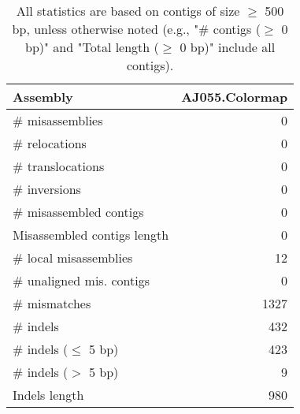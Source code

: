 \documentclass[12pt,a4paper]{article}
\begin{document}
\begin{table}[ht]
\begin{center}
\caption{All statistics are based on contigs of size $\geq$ 500 bp, unless otherwise noted (e.g., "\# contigs ($\geq$ 0 bp)" and "Total length ($\geq$ 0 bp)" include all contigs).}
\begin{tabular}{|l*{1}{|r}|}
\hline
Assembly & AJ055.Colormap \\ \hline
\# misassemblies & 0 \\ \hline
\hspace{5mm}\# relocations & 0 \\ \hline
\hspace{5mm}\# translocations & 0 \\ \hline
\hspace{5mm}\# inversions & 0 \\ \hline
\# misassembled contigs & 0 \\ \hline
Misassembled contigs length & 0 \\ \hline
\# local misassemblies & 12 \\ \hline
\# unaligned mis. contigs & 0 \\ \hline
\# mismatches & 1327 \\ \hline
\# indels & 432 \\ \hline
\hspace{5mm}\# indels ($\leq$ 5 bp) & 423 \\ \hline
\hspace{5mm}\# indels ($>$ 5 bp) & 9 \\ \hline
Indels length & 980 \\ \hline
\end{tabular}
\end{center}
\end{table}
\end{document}
